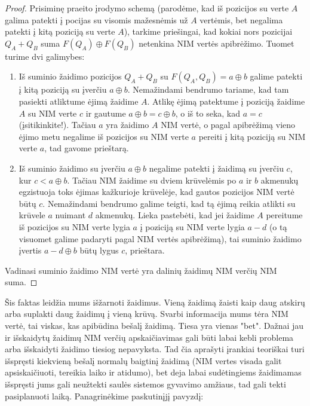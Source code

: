 \begin{proof}
  Prisiminę praeito įrodymo schemą (parodėme, kad iš pozicijos su verte $A$
  galima patekti į pocijas su visomis mažesnėmis už $A$ vertėmis, bet
  negalima patekti į kitą poziciją su verte $A$), tarkime priešingai, kad
  kokiai nors pozicijai $Q_A+Q_B$ suma $F(Q_A) \oplus F(Q_B)$ netenkina NIM
  vertės apibrėžimo. Tuomet turime dvi galimybes:

  \begin{enumerate}
    \item Iš suminio žaidimo pozicijos $Q_A+Q_B$ su $F(Q_A,Q_B)=a\oplus b$
      galime patekti į kitą poziciją su įverčiu $a\oplus b$. Nemažindami
      bendrumo tariame, kad tam pasiekti atliktume ėjimą žaidime $A$.
      Atlikę ėjimą patektume į poziciją žaidime $A$ su NIM verte $c$ ir
      gautume $a\oplus b = c\oplus b$, o iš to seka, kad $a=c$
      (įsitikinkite!). Tačiau $a$ yra žaidimo $A$ NIM vertė, o pagal
      apibrėžimą vieno ėjimo metu negalime iš pozicijos su NIM verte $a$
      pereiti į kitą poziciją su NIM verte $a$, tad gavome prieštarą.
    \item Iš suminio žaidimo su įverčiu $a\oplus b$ negalime patekti į
      žaidimą su įverčiu $c$, kur $c < a\oplus b$. Tačiau NIM žaidime su
      dviem krūvelėmis po $a$ ir $b$ akmenukų egzistuoja toks ėjimas
      kažkurioje krūvelėje, kad gautos pozicijos NIM vertė būtų $c$.
      Nemažindami bendrumo galime teigti, kad tą ėjimą reikia atlikti su
      krūvele $a$ nuimant $d$ akmenukų. Lieka pastebėti, kad jei žaidime
      $A$ pereitume iš pozicijos su NIM verte lygia $a$ į poziciją su NIM
      verte lygia $a-d$ (o tą visuomet galime padaryti pagal NIM vertės
      apibrėžimą), tai suminio žaidimo įvertis $a-d\oplus b$ būtų lygus
      $c$, prieštara.
  \end{enumerate}
  Vadinasi suminio žaidimo NIM vertė yra dalinių žaidimų NIM verčių NIM suma.
\end{proof}

Šis faktas leidžia mums išžarnoti žaidimus. Vieną žaidimą žaisti kaip daug
atskirų arba suplakti daug žaidimų į vieną krūvą. Svarbi informacija mums tėra
NIM vertė, tai viskas, kas apibūdina bešalį žaidimą. Tiesa yra vienas "bet".
Dažnai jau ir išskaidytų žaidimų NIM verčių apskaičiavimas gali būti labai
kebli problema arba išskaidyti žaidimo tiesiog nepavyksta. Tad čia aprašyti
įrankiai teoriškai turi išspręsti kiekvieną bešalį normalų baigtinį žaidimą (NIM vertes
visada galit apsiskaičiuoti, tereikia laiko ir atidumo), bet deja labai
sudėtingiems žaidimamas išspręsti jums gali neužtekti saulės sistemos gyvavimo
amžiaus, tad gali tekti pasiplanuoti laiką. Panagrinėkime paskutinįjį
pavyzdį:

